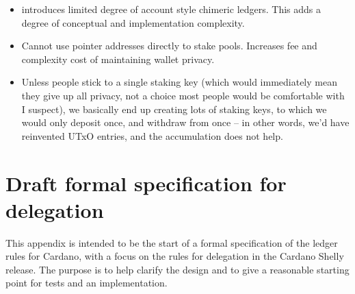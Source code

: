 \documentclass[11pt,a4paper]{article}
\begin{document}
\begin{itemize}
\item
  introduces limited degree of account style chimeric ledgers. This adds
  a degree of conceptual and implementation complexity.
\item
  Cannot use pointer addresses directly to stake pools. Increases fee
  and complexity cost of maintaining wallet privacy.
\item
  Unless people stick to a single staking key (which would immediately
  mean they give up all privacy, not a choice most people would be
  comfortable with I suspect), we basically end up creating lots of
  staking keys, to which we would only deposit once, and withdraw from
  once -- in other words, we'd have reinvented UTxO entries, and the
  accumulation does not help.
\end{itemize}

\section{Draft formal specification for delegation}
\label{formal-specification-for-delegation}

This appendix is intended to be the start of a formal specification of the
ledger rules for Cardano, with a focus on the rules for delegation in the
Cardano Shelly release. The purpose is to help clarify the design and to give
a reasonable starting point for tests and an implementation.

\newcommand{\powerset}[1]{\mathbb{P}~#1}
\newcommand{\restrictdom}{\lhd}
\newcommand{\subtractdom}{\mathbin{\slashed{\restrictdom}}}
\newcommand{\restrictrange}{\rhd}
\newcommand{\union}{\cup}
\newcommand{\unionoverride}{\mathbin{\underrightarrow\cup}}
\newcommand{\uniondistinct}{\uplus}
\newcommand{\and}{~\wedge~} %
\newcommand{\var}[1]{\mathit{#1}}
\newcommand{\fun}[1]{\mathsf{#1}}
\newcommand{\type}[1]{\mathsf{#1}}
\newcommand{\serialised}[1]{\llbracket #1 \rrbracket}
\newcommand{\signed}[2]{\llbracket #1 \rrbracket_{#2}}
\newcommand{\verified}[3]{\mathcal{V}_{#1}\llbracket #2 \rrbracket_{#3}}
\newcommand{\size}[1]{\left| #1 \right|}
\newcommand{\transitionarrow}[2]{\xlongrightarrow[\textsc{#1}]{#2}}
\end{document}
